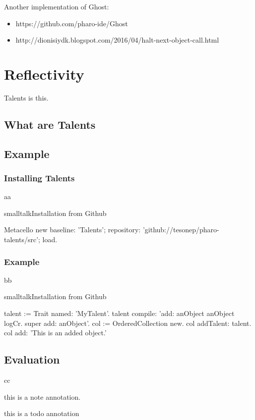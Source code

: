 \documentclass[10pt,twoside,english]{_support/latex/sbabook/sbabook}
\begin{document}
Another implementation of Ghost:

\begin{itemize}
\item https://github.com/pharo-ide/Ghost
\item http://dionisiydk.blogspot.com/2016/04/halt-next-object-call.html
\end{itemize}
\chapter{Reflectivity}
Talents \cite{ressia2014talents}is this.
\section{What are Talents}\section{Example}\subsection{Installing Talents}
aa

\begin{listing}[float, label=install]{smalltalk}{Installation from Github}

Metacello new
  baseline: 'Talents';
  repository: 'github://tesonep/pharo-talents/src';
  load.
\end{listing}
\subsection{Example}
bb

\begin{listing}[float, label=talent-example]{smalltalk}{Installation from Github}

talent := Trait named: 'MyTalent'.
talent compile: 'add: anObject
anObject logCr.
super add: anObject'.
col := OrderedCollection new.
col addTalent: talent.
col add: 'This is an added object.'
\end{listing}
\section{Evaluation}
cc

\begin{note}
this is a note annotation.
\end{note}

\begin{todo}
this is a todo annotation
\end{todo}
\end{document}

